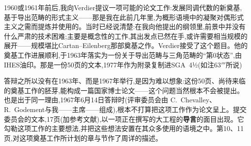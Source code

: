 1960或1961年前后,我向Verdier提议一项可能的论文工作:发展同调代数的新奠基,基于导出范畴的形式主义——那是我在此前几年里,为概形语境中的凝聚对偶形式主义之需而提炼并使用的。当时已经说清楚:在我向他提出的纲领里,前景中并没有什么严肃的技术困难;主要是概念性的工作,其出发点已然在手,或许需要相当规模的展开——规模堪比Cartan--Eilenberg那部奠基之作。Verdier接受了这个题目。他的奠基工作进展顺利,于1963年落实为一份关于导出范畴与三角范畴的“第0状态”,由IHES油印。那是一份50页的文本,1977年作为附录复制进SGA~4½(如注63$'''$所说)

\dmark{}答辩之所以没有在1963年、而是1967年举行,是因为难以想象:这份50页、尚待来临的奠基工作的胚芽,能构成一篇国家博士论文——这个问题当然根本不会被提出。也是出于同一理由,1967年6月14日答辩时(评审委员会由 C.~Chevalley、R.~Godement与我——主席——组成),根本不打算把这项工作作为论文呈上。提交委员会的文本,17页(加参考文献),以一项正在撰写的大工程的\textbf{导言}的面目出现。它勾勒这项工作的主要想法,并把这些想法安置在其众多使用的语境之中。第10、11页,对这项奠基工作所计划的章与节作了周详的描述。

